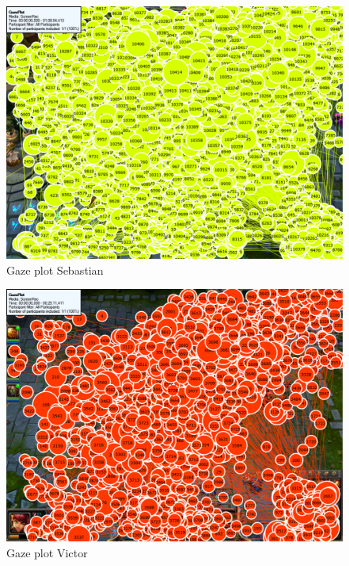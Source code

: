 \documentclass{article}
\begin{document}
\begin{figure}[h!]
\begin{center}
\includegraphics*[width=0.90\columnwidth]{images/gazeplot/Sebastian}
\end{center}
\caption{Gaze plot Sebastian}
\label{gaze_seb}
\end{figure}

\begin{figure}[h!]
\begin{center}
\includegraphics*[width=0.90\columnwidth]{images/gazeplot/Victor}
\end{center}
\caption{Gaze plot Victor}
\label{gaze_vic}
\end{figure}
\end{document}

